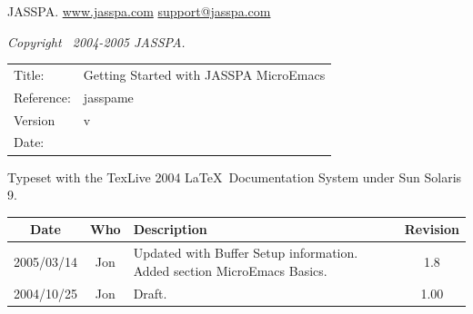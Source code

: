 \documentclass[11pt,a4paper,pdftex]{article}
\newcommand{\docTitle}{Getting Started with JASSPA MicroEmacs}
\newcommand{\docDate}{\CVSDate}
\newcommand{\docVersion}{\CVSRevision}
\newcommand{\docReference}{jasspame}
\newcommand{\tableTitle}[1]{\textbf{#1}}%
\begin{document}
\newpage
\setlength{\parindent}{0pt}
\setlength{\parskip}{0.5ex}
\pagestyle{fancy}

\begin{small}
\vspace{.5in}
JASSPA.
\href{http://www.jasspa.com}{www.jasspa.com}\newline
\href{mailto:support@jasspa.com}{support@jasspa.com}\newline

\vspace{0.5in}

\textit{Copyright \textcopyright\ 2004-2005 JASSPA.}


\vspace{0.5in}

\begin{table}[ht]
  \begin{tabular}{ll}
    Title:        & \docTitle \\
    Reference:    & \docReference \\
    Version       & v\docVersion \\
    Date:         & \docDate \\
  \end{tabular}
\end{table}

Typeset with the TexLive 2004 \LaTeX\ Documentation System under Sun Solaris
9.

\vspace{0.5in}

\begin{center}
  \begin{table}[ht]
    \begin{tabular}{|c|c|p{4in}|c|}
    \hline
    \tableTitle{Date} & \tableTitle{Who} & \tableTitle{Description} & \tableTitle{Revision} \\
    \hline
    2005/03/14 & Jon & Updated with Buffer Setup information.
                       Added section MicroEmacs Basics. & 1.8\\ \hline
    2004/10/25 & Jon & Draft. & 1.00 \\ \hline
    \end{tabular}
  \end{table}
\end{center}
\end{small}
\end{document}
